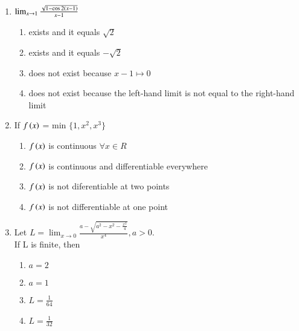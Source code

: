\documentclass[journal,12pt,twocolumn]{IEEEtran}
\theoremstyle{remark}
\begin{document}
\begin{enumerate}
    \item 
    {$\lim_{x \to1}\frac{\sqrt{1-\cos 2\left(x-1\right)}}{x-1}$} \\

    \hfill 
    {}
    \begin{enumerate}[label=(\alph*)]
        
        \item exists and it equals $\sqrt{2}$
        \item exists and it equals $-\sqrt{2}$
        \item does not exist because $x-1\mapsto 0$
        \item does not exist because the left-hand limit is not equal to the right-hand limit
    \end{enumerate}


    \item 
    {If $f\left(x\right)$ = min $\{1,x^2,x^3\}$} \\

    \hfill 
    {}
    
    \begin{enumerate}[label=(\alph*)]
        
        \item $f\left(x\right)$ is continuous $\forall x \in R$
        \item $f\left(x\right)$ is continuous and differentiable everywhere
        \item $f\left(x\right)$ is not diferentiable at two points
        \item $f\left(x\right)$ is not differentiable at one point
    \end{enumerate}


    \item 
    {Let $L=\lim_{x \to0}\frac{a-\sqrt{a^2-x^2-\frac{x^2}{4}}}{x^4}, a>0$.\\ If L is finite, then} \\

    \hfill 
    {}
    
    \begin{enumerate}[label=(\alph*)]
        
        \item $a=2$ 
        \item $a=1$
        \item $L=\frac{1}{64}$
        \item $L=\frac{1}{32}$
    \end{enumerate}



\end{enumerate}
\end{document}
